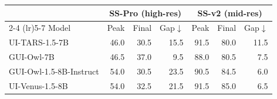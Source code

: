 \begin{tabular}{lrrr@{\hspace{1.5em}}rrr}
\toprule
& \multicolumn{3}{c}{SS-Pro (high-res)} & \multicolumn{3}{c}{SS-v2 (mid-res)} \\
\cmidrule(lr){2-4} \cmidrule(lr){5-7}
Model & Peak & Final & Gap$\downarrow$ & Peak & Final & Gap$\downarrow$ \\
\midrule
UI-TARS-1.5-7B & 46.0 & 30.5 & 15.5 & 91.5 & 80.0 & 11.5 \\
GUI-Owl-7B & 46.5 & 37.0 & 9.5 & 88.0 & 80.5 & 7.5 \\
GUI-Owl-1.5-8B-Instruct & 54.0 & 30.5 & 23.5 & 90.5 & 84.5 & 6.0 \\
UI-Venus-1.5-8B & 54.0 & 32.5 & 21.5 & 91.5 & 85.0 & 6.5 \\
\bottomrule
\end{tabular}
